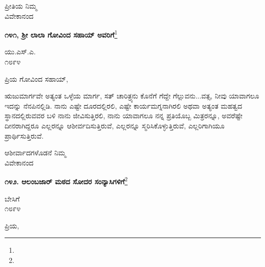 {\flushright
ಪ್ರೀತಿಯ ನಿಮ್ಮ\\ವಿವೇಕಾನಂದ\par}

\begin{center}
\textbf{೧೪೧, ಶ‍್ರೀ ಲಾಲಾ ಗೋವಿಂದ ಸಹಾಯ್ ಅವರಿಗೆ}\footnote{}
\end{center}

\vspace{-0.75cm}

\begin{flushright}
ಯು.ಎಸ್.ಎ.\\೧೮೯೪
\end{flushright}

\vspace{-0.5cm}

\noindent
ಪ್ರಿಯ ಗೋವಿಂದ ಸಹಾಯ್,

ಋಜುಮಾರ್ಗವೇ ಅತ್ಯಂತ ಒಳ್ಳೆಯ ಮಾರ್ಗ, ಸತ್ ಚಾರಿತ್ರ್ಯನು ಕೊನೆಗೆ ಗೆದ್ದೇ ಗೆಲ್ಲುವನು...ವತ್ಸ, ನೀವು ಯಾವಾಗಲೂ ಇದನ್ನು ನೆನಪಿನಲ್ಲಿಡಿ. ನಾನು ಎಷ್ಟೇ ದೂರದಲ್ಲಿ\break ರಲಿ, ಎಷ್ಟೇ ಕಾರ್ಯಮಗ್ನನಾಗಿರಲಿ ಅಥವಾ ಅತ್ಯಂತ ಮಹತ್ವದ ಸ್ಥಾನದಲ್ಲಿರುವವರ ಬಳಿ ನಾನು ಜೀವಿಸುತ್ತಿರಲಿ, ನಾನು ಯಾವಾಗಲೂ ನನ್ನ ಪ್ರತಿಯೊಬ್ಬ ಮಿತ್ರರನ್ನೂ, ಅವರೆಷ್ಟೇ ದೀನರಾಗಿದ್ದರೂ ಎಲ್ಲರನ್ನೂ ಆಶೀರ್ವದಿಸುತ್ತಿರುವೆ, ಎಲ್ಲರನ್ನೂ ಸ್ಮರಿಸಿಕೊಳ್ಳುತ್ತಿರುವೆ, ಎಲ್ಲರಿಗಾಗಿಯೂ ಪ್ರಾರ್ಥಿಸುತ್ತಿರುವೆ.

\vspace{-0.5cm}

{\flushright
ಆಶೀರ್ವಾದಗಳೊಡನೆ ನಿಮ್ಮ\\ವಿವೇಕಾನಂದ\par}

\begin{center}
\textbf{೧೪೨. ಆಲಂಬಜಾರ್‌ ಮಠದ ಸೋದರ ಸಂನ್ಯಾಸಿಗಳಿಗೆ}\footnote{}
\end{center}

\vspace{-0.5cm}

\begin{flushright}
ಬೇಸಿಗೆ\\೧೮೯೪
\end{flushright}

\vspace{-0.5cm}

\noindent
ಪ್ರಿಯ,

